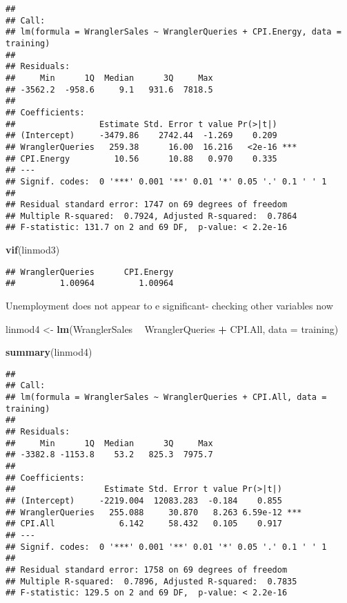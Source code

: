\documentclass[]{article}
\newenvironment{Shaded}{\begin{snugshade}}{\end{snugshade}}
\newcommand{\KeywordTok}[1]{\textcolor[rgb]{0.13,0.29,0.53}{\textbf{#1}}}
\newcommand{\DataTypeTok}[1]{\textcolor[rgb]{0.13,0.29,0.53}{#1}}
\newcommand{\StringTok}[1]{\textcolor[rgb]{0.31,0.60,0.02}{#1}}
\newcommand{\OperatorTok}[1]{\textcolor[rgb]{0.81,0.36,0.00}{\textbf{#1}}}
\newcommand{\NormalTok}[1]{#1}
\begin{document}
\begin{verbatim}
## 
## Call:
## lm(formula = WranglerSales ~ WranglerQueries + CPI.Energy, data = training)
## 
## Residuals:
##     Min      1Q  Median      3Q     Max 
## -3562.2  -958.6     9.1   931.6  7818.5 
## 
## Coefficients:
##                 Estimate Std. Error t value Pr(>|t|)    
## (Intercept)     -3479.86    2742.44  -1.269    0.209    
## WranglerQueries   259.38      16.00  16.216   <2e-16 ***
## CPI.Energy         10.56      10.88   0.970    0.335    
## ---
## Signif. codes:  0 '***' 0.001 '**' 0.01 '*' 0.05 '.' 0.1 ' ' 1
## 
## Residual standard error: 1747 on 69 degrees of freedom
## Multiple R-squared:  0.7924, Adjusted R-squared:  0.7864 
## F-statistic: 131.7 on 2 and 69 DF,  p-value: < 2.2e-16
\end{verbatim}

\begin{Shaded}
\begin{Highlighting}[]
\KeywordTok{vif}\NormalTok{(linmod3)}
\end{Highlighting}
\end{Shaded}

\begin{verbatim}
## WranglerQueries      CPI.Energy 
##         1.00964         1.00964
\end{verbatim}

Unemployment does not appear to e significant- checking other variables
now

\begin{Shaded}
\begin{Highlighting}[]
\NormalTok{linmod4 <-}\StringTok{ }\KeywordTok{lm}\NormalTok{(WranglerSales }\OperatorTok{~}\StringTok{ }\NormalTok{WranglerQueries }\OperatorTok{+}\StringTok{ }\NormalTok{CPI.All, }\DataTypeTok{data =}\NormalTok{ training)}

\KeywordTok{summary}\NormalTok{(linmod4)}
\end{Highlighting}
\end{Shaded}

\begin{verbatim}
## 
## Call:
## lm(formula = WranglerSales ~ WranglerQueries + CPI.All, data = training)
## 
## Residuals:
##     Min      1Q  Median      3Q     Max 
## -3382.8 -1153.8    53.2   825.3  7975.7 
## 
## Coefficients:
##                  Estimate Std. Error t value Pr(>|t|)    
## (Intercept)     -2219.004  12083.283  -0.184    0.855    
## WranglerQueries   255.088     30.870   8.263 6.59e-12 ***
## CPI.All             6.142     58.432   0.105    0.917    
## ---
## Signif. codes:  0 '***' 0.001 '**' 0.01 '*' 0.05 '.' 0.1 ' ' 1
## 
## Residual standard error: 1758 on 69 degrees of freedom
## Multiple R-squared:  0.7896, Adjusted R-squared:  0.7835 
## F-statistic: 129.5 on 2 and 69 DF,  p-value: < 2.2e-16
\end{verbatim}
\end{document}
